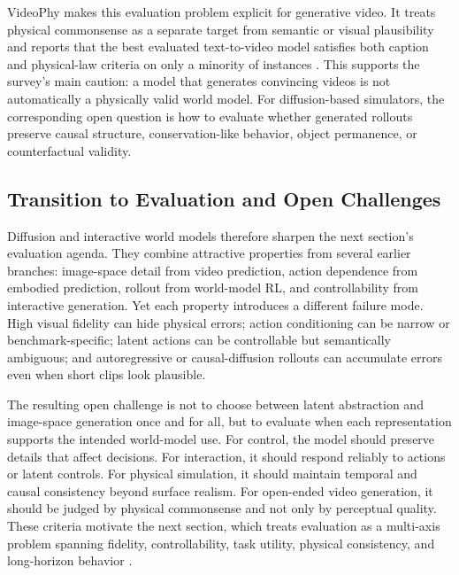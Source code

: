 VideoPhy makes this evaluation problem explicit for generative video. It treats physical commonsense as a separate target from semantic or visual plausibility and reports that the best evaluated text-to-video model satisfies both caption and physical-law criteria on only a minority of instances \cite{bansal2025_videophy_prov}. This supports the survey's main caution: a model that generates convincing videos is not automatically a physically valid world model. For diffusion-based simulators, the corresponding open question is how to evaluate whether generated rollouts preserve causal structure, conservation-like behavior, object permanence, or counterfactual validity.

\subsection{Transition to Evaluation and Open Challenges}

Diffusion and interactive world models therefore sharpen the next section's evaluation agenda. They combine attractive properties from several earlier branches: image-space detail from video prediction, action dependence from embodied prediction, rollout from world-model RL, and controllability from interactive generation. Yet each property introduces a different failure mode. High visual fidelity can hide physical errors; action conditioning can be narrow or benchmark-specific; latent actions can be controllable but semantically ambiguous; and autoregressive or causal-diffusion rollouts can accumulate errors even when short clips look plausible.

The resulting open challenge is not to choose between latent abstraction and image-space generation once and for all, but to evaluate when each representation supports the intended world-model use. For control, the model should preserve details that affect decisions. For interaction, it should respond reliably to actions or latent controls. For physical simulation, it should maintain temporal and causal consistency beyond surface realism. For open-ended video generation, it should be judged by physical commonsense and not only by perceptual quality. These criteria motivate the next section, which treats evaluation as a multi-axis problem spanning fidelity, controllability, task utility, physical consistency, and long-horizon behavior \cite{oh2015_action_conditional_video_prediction_prov,alonso2024_diamond_prov,bruce2024_genie_prov,bansal2025_videophy_prov}.
